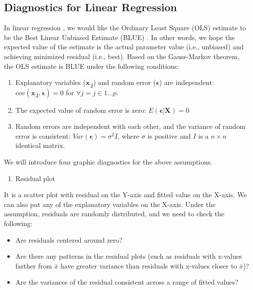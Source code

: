 \documentclass[
  12pt,
]{krantz}
\providecommand{\tightlist}{%
  \setlength{\itemsep}{0pt}\setlength{\parskip}{0pt}}
\begin{document}
\hypertarget{diagnostics-for-linear-regression}{%
\subsection{Diagnostics for Linear Regression}\label{diagnostics-for-linear-regression}}

In linear regression , we would like the Ordinary Least Square (OLS)  estimate to be the Best Linear Unbiased Estimate (BLUE) . In other words, we hope the expected value of the estimate is the actual parameter value (i.e., unbiased) and achieving minimized residual (i.e., best). Based on the Gauss-Markov theorem, the OLS  estimate is BLUE  under the following conditions:

\begin{enumerate}
\def\labelenumi{\arabic{enumi}.}
\item
  Explanatory variables (\(\mathbf{x_{.j}}\)) and random error (\(\symbf{\epsilon}\)) are independent: \(cov(\mathbf{x_{.j},\epsilon})=0\) for \(\forall j=j\in1...p\).
\item
  The expected value of random error is zero: \(E(\symbf{\epsilon|X})=0\)
\item
  Random errors are independent with each other, and the variance of random error is consistent: \(Var(\symbf{\epsilon})=\sigma^{2}I\), where \(\sigma\) is positive and \(I\) is a \(n \times n\) identical matrix.
\end{enumerate}

We will introduce four graphic diagnostics for the above assumptions.

\begin{enumerate}
\def\labelenumi{(\arabic{enumi})}
\tightlist
\item
  Residual plot 
\end{enumerate}

It is a scatter plot with residual on the Y-axis and fitted value on the X-axis. We can also put any of the explanatory variables on the X-axis. Under the assumption, residuals are randomly distributed, and we need to check the following:

\begin{itemize}
\tightlist
\item
  Are residuals centered around zero?
\item
  Are there any patterns in the residual plots (such as residuals with x-values farther from \(\bar{x}\) have greater variance than residuals with x-values closer to \(\bar{x}\))?
\item
  Are the variances of the residual consistent across a range of fitted values?
\end{itemize}
\end{document}
